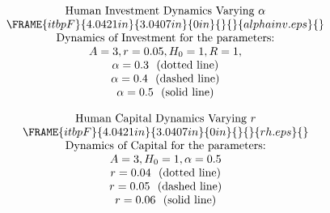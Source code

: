 \documentclass{article}
\numberwithin{equation}{section}
\begin{document}
\pagebreak 
\begin{equation*}
\begin{tabular}{c}
$\text{Human Investment Dynamics Varying }\alpha $ \\ 
$\FRAME{itbpF}{4.0421in}{3.0407in}{0in}{}{}{alphainv.eps}{\special{language
"Scientific Word";type "GRAPHIC";maintain-aspect-ratio TRUE;display
"USEDEF";valid_file "F";width 4.0421in;height 3.0407in;depth
0in;original-width 5.8219in;original-height 4.3708in;cropleft "0";croptop
"1";cropright "1";cropbottom "0";filename 'alphaInv.eps';file-properties
"XNPEU";}}$ \\ 
$\text{Dynamics of Investment for the parameters:}$ \\ 
$A=3,r=0.05,H_{0}=1,R=1,$ \\ 
$\alpha =0.3\text{ \ (dotted line)}$ \\ 
$\alpha =0.4\text{ \ (dashed line)}$ \\ 
$\alpha =0.5\text{ \ (solid line)}$%
\end{tabular}%
\end{equation*}

\pagebreak 

\pagebreak

\begin{equation*}
\begin{tabular}{c}
$\text{Human Capital Dynamics Varying }r$ \\ 
$\FRAME{itbpF}{4.0421in}{3.0407in}{0in}{}{}{rh.eps}{\special{language
"Scientific Word";type "GRAPHIC";maintain-aspect-ratio TRUE;display
"USEDEF";valid_file "F";width 4.0421in;height 3.0407in;depth
0in;original-width 5.8219in;original-height 4.3708in;cropleft "0";croptop
"1";cropright "1";cropbottom "0";filename 'rH.eps';file-properties "XNPEU";}}
$ \\ 
$\text{Dynamics of Capital for the parameters:}$ \\ 
$A=3,H_{0}=1,\alpha =0.5$ \\ 
$r=0.04\text{ \ (dotted line)}$ \\ 
$r=0.05\text{ \ (dashed line)}$ \\ 
$r=0.06\text{ \ (solid line)}$%
\end{tabular}%
\bigskip
\end{equation*}

\pagebreak
\end{document}
